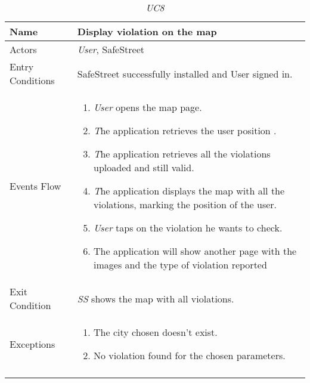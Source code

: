 \documentclass[../../../RASD.tex]{subfiles}
\begin{document}
    \begin{center}
        \begin{longtable}{| p{.35\linewidth} | p{.65\linewidth} |}
            \hline
            \textbf{Name} & \textbf{Display violation on the map}\\ \hline
            Actors & \textit{User}, SafeStreet\\ \hline
            Entry Conditions & SafeStreet successfully installed and User signed in.\\ \hline
            Events Flow &
            \begin{enumerate}
                \item \textit{User} opens the map page.
                \item \textit The application retrieves the user position .
                \item \textit The application retrieves all the violations uploaded and still valid.
                \item \textit The application displays the map with all the violations, marking the position of the user.
                \item \textit{User} taps on the violation he wants to check.
                \item The application will show another page with the images and the type of violation reported
            \end{enumerate}
            \\ \hline
            Exit Condition & \textit{SS} shows the map with all violations.\\ \hline
            Exceptions &
            \begin{enumerate}
                \item The city chosen doesn’t exist.
                \item No violation found for the chosen parameters.
            \end{enumerate}
            \\
            \hline
            \caption{\textit{UC8}}
        \end{longtable}
    \end{center}
\end{document}
